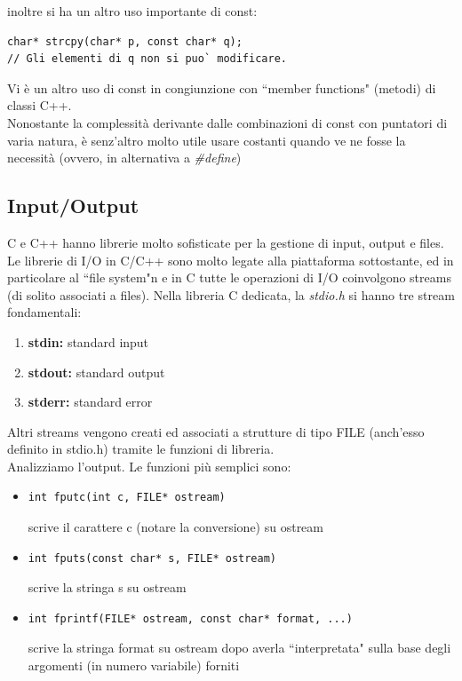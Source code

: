 \documentclass[a4paper,12pt, oneside]{book}
\begin{document}
inoltre si ha un altro uso importante di const:
\begin{verbatim}
char* strcpy(char* p, const char* q);
// Gli elementi di q non si puo` modificare.
\end{verbatim}
Vi è un altro uso di const in congiunzione con “member functions" (metodi) di classi C++.\\
Nonostante la complessità derivante dalle combinazioni di const con puntatori di varia natura, è senz’altro molto utile usare costanti quando ve ne fosse la necessità (ovvero, in alternativa a \textit{\#define})
\subsection{Input/Output}
C e C++ hanno librerie molto sofisticate per la gestione di input, output e files. Le librerie di I/O in C/C++ sono molto legate alla piattaforma
sottostante, ed in particolare al “file system"n e in C tutte le operazioni di I/O coinvolgono streams (di solito
associati a files). Nella libreria C dedicata, la \textit{stdio.h} si hanno tre stream fondamentali:
\begin{enumerate}
\item \textbf{stdin:} standard input
\item \textbf{stdout:} standard output
\item \textbf{stderr:} standard error
\end{enumerate}
Altri streams vengono creati ed associati a strutture di tipo FILE (anch’esso definito in stdio.h) tramite le funzioni di libreria.\\
Analizziamo l'output. Le funzioni più semplici sono:
\begin{itemize}
\item \begin{verbatim}
int fputc(int c, FILE* ostream)
\end{verbatim}
scrive il carattere c (notare la conversione) su ostream

\item \begin{verbatim}
int fputs(const char* s, FILE* ostream)
\end{verbatim}
scrive la stringa s su ostream
\item \begin{verbatim}
int fprintf(FILE* ostream, const char* format, ...)\end{verbatim}
scrive la stringa format su ostream dopo averla “interpretata"
sulla base degli argomenti (in numero variabile) forniti
\end{itemize} 
\end{document}
